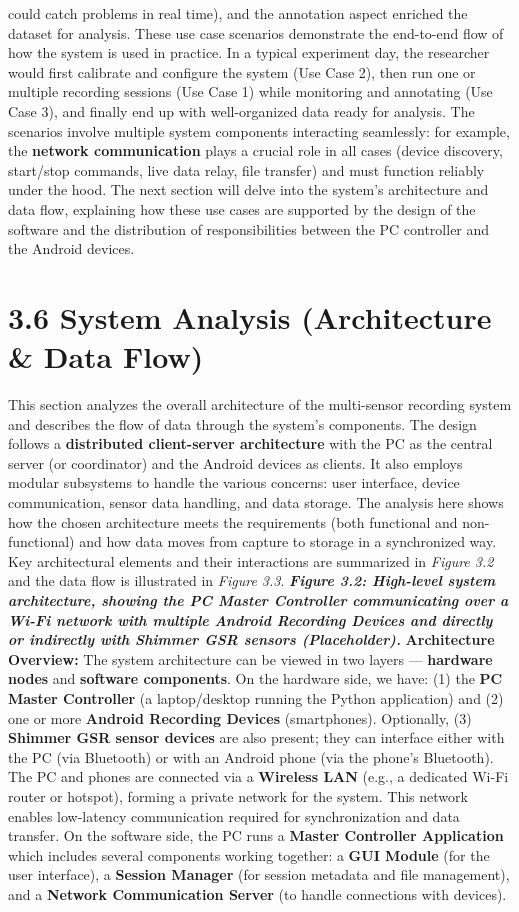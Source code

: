 could catch problems in real time), and the annotation aspect enriched the dataset for analysis. These use case scenarios demonstrate the end-to-end flow of how the system is used in practice. In a typical experiment day, the researcher would first calibrate and configure the system (Use Case 2), then run one or multiple recording sessions (Use Case 1) while monitoring and annotating (Use Case 3), and finally end up with well-organized data ready for analysis. The scenarios involve multiple system components interacting seamlessly: for example, the \textbf{network communication} plays a crucial role in all cases (device discovery, start/stop commands, live data relay, file transfer) and must function reliably under the hood. The next section will delve into the system's architecture and data flow, explaining how these use cases are supported by the design of the software and the distribution of responsibilities between the PC controller and the Android devices. \section{3.6 System Analysis (Architecture \& Data Flow)} This section analyzes the overall architecture of the multi-sensor recording system and describes the flow of data through the system's components. The design follows a \textbf{distributed client-server architecture} with the PC as the central server (or coordinator) and the Android devices as clients. It also employs modular subsystems to handle the various concerns: user interface, device communication, sensor data handling, and data storage. The analysis here shows how the chosen architecture meets the requirements (both functional and non-functional) and how data moves from capture to storage in a synchronized way. Key architectural elements and their interactions are summarized in \textit{Figure 3.2} and the data flow is illustrated in \textit{Figure 3.3}. \textit{\textbf{Figure 3.2: High-level system architecture, showing the PC Master Controller communicating over a Wi-Fi network with multiple Android Recording Devices and directly or indirectly with Shimmer GSR sensors (Placeholder).}} \textbf{Architecture Overview:} The system architecture can be viewed in two layers --- \textbf{hardware nodes} and \textbf{software components}. On the hardware side, we have: (1) the \textbf{PC Master Controller} (a laptop/desktop running the Python application) and (2) one or more \textbf{Android Recording Devices} (smartphones). Optionally, (3) \textbf{Shimmer GSR sensor devices} are also present; they can interface either with the PC (via Bluetooth) or with an Android phone (via the phone's Bluetooth). The PC and phones are connected via a \textbf{Wireless LAN} (e.g., a dedicated Wi-Fi router or hotspot), forming a private network for the system. This network enables low-latency communication required for synchronization and data transfer. On the software side, the PC runs a \textbf{Master Controller Application} which includes several components working together: a \textbf{GUI Module} (for the user interface), a \textbf{Session Manager} (for session metadata and file management), and a \textbf{Network Communication Server} (to handle connections with devices). 